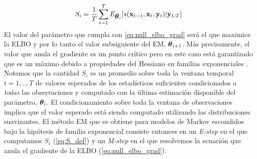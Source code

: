 \begin{align} \label{eq:S_def}
    S_i = \frac{1}{T}\sum_{t=1}^T E_{\mbox{\boldmath$ \theta $}_i} [s(\mathbf{x}_{t-1}, \mathbf{x}_t, \mathbf{y}_t) | \mathbf{y}_{1:T}]
\end{align}
El valor del parámetro que cumpla con \ref{eq:null_elbo_grad} será el que maximice la ELBO y por lo tanto el valor subsiguiente del EM, $\mbox{\boldmath$ \theta $}_{i+1}$. Más precisamente, el valor que anula el gradiente es un punto crítico pero en este caso está garantizado que es un máximo debido a propiedades del Hessiano en familias exponenciales \citep{Wainwright2008}. Notemos que la cantidad $S_i$ es un promedio sobre toda la ventana temporal $t=1, .., T$ de valores esperados de los estadísticos suficientes condicionados a \textit{todas} las observaciones y computado con la última estimación disponible del parámetro, $\mbox{\boldmath$ \theta $}_i$. El condicionamiento sobre toda la ventana de observaciones implica que el valor esperado está siendo computado utilizando las distribuciones suavizantes. El método EM que se obtiene para modelos de Markov escondidos bajo la hipótesis de familia exponencial consiste entonces en un \textit{E-step} en el que computamos $S_i$ (\ref{eq:S_def}) y un \textit{M-step} en el que resolvemos la ecuación que anula el gradiente de la ELBO (\ref{eq:null_elbo_grad}).

